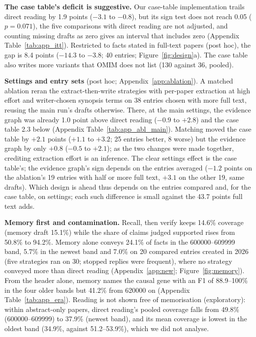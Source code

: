 \documentclass{article} %
\begin{document}
\textbf{The case table's deficit is suggestive.} Our case-table implementation trails direct reading by 1.9 points ($-3.1$ to $-0.8$), but its sign test does not reach 0.05 ($p=0.071$), the five comparisons with direct reading are not adjusted, and counting missing drafts as zero gives an interval that includes zero (Appendix Table~\ref{tab:app_itt}). Restricted to facts stated in full-text papers (post hoc), the gap is 8.4 points ($-14.3$ to $-3.8$; 40 entries; Figure~\ref{fig:design}a). The case table also writes more variants that OMIM does not list (130 against 36, pooled).

\textbf{Settings and entry sets} (post hoc; Appendix~\ref{app:ablation}). A matched ablation reran the extract-then-write strategies with per-paper extraction at high effort and writer-chosen synopsis terms on 38 entries chosen with more full text, reusing the main run's drafts otherwise. There, at the main settings, the evidence graph was already 1.0 point above direct reading ($-0.9$ to $+2.8$) and the case table 2.3 below (Appendix Table~\ref{tab:app_abl_main}). Matching moved the case table by $+2.1$ points ($+1.1$ to $+3.2$; 25 entries better, 8 worse) but the evidence graph by only $+0.8$ ($-0.5$ to $+2.1$); as the two changes were made together, crediting extraction effort is an inference. The clear settings effect is the case table's; the evidence graph's sign depends on the entries averaged ($-1.2$ points on the ablation's 19 entries with half or more full text, $+3.1$ on the other 19, same drafts). Which design is ahead thus depends on the entries compared and, for the case table, on settings; each such difference is small against the 43.7 points full text adds.

\textbf{Memory first and contamination.} Recall, then verify keeps 14.6\% coverage (memory draft 15.1\%) while the share of claims judged supported rises from 50.8\% to 94.2\%. Memory alone conveys 24.1\% of facts in the 600000--609999 band, 5.7\% in the newest band and 7.0\% on 20 compared entries created in 2026 (five strategies ran on 30; stopped replies were frequent), where no strategy conveyed more than direct reading (Appendix~\ref{app:new}; Figure~\ref{fig:memory}). From the header alone, memory names the causal gene with an F1 of 88.9--100\% in the four older bands but 41.2\% from 620000 on (Appendix Table~\ref{tab:app_era}). Reading is not shown free of memorisation (exploratory): within abstract-only papers, direct reading's pooled coverage falls from 49.8\% (600000--609999) to 37.9\% (newest band), and its mean coverage is lowest in the oldest band (34.9\%, against 51.2--53.9\%), which we did not analyse.
\end{document}
